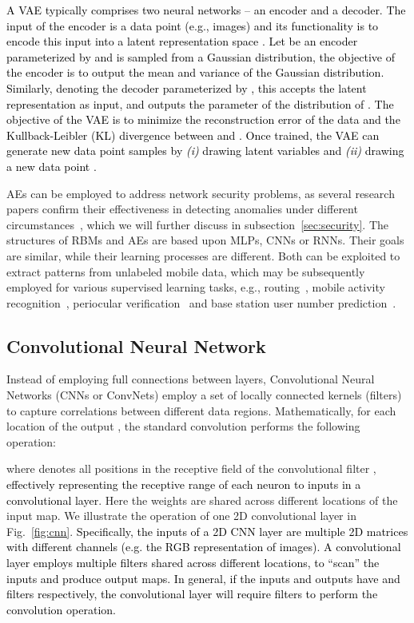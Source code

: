\documentclass[journal,comsoc,letter]{IEEEtran}
\newcommand{\edit}[1]{\textcolor{black}{#1}}
\newcommand{\rev}[1]{\textcolor{black}{#1}}
\begin{document}
\edit{
A VAE typically comprises two neural networks -- an encoder and a decoder. The input of the encoder is a data point  (e.g., images) and its functionality is to encode this input into a latent representation space . Let  be an encoder parameterized by  and  is sampled from a Gaussian distribution, the objective of the encoder is to output the mean and variance of the Gaussian distribution.}
\edit{
Similarly, denoting  the decoder parameterized by , this accepts the latent representation  as input, and outputs the parameter of the distribution of . The objective of the VAE is to minimize the reconstruction error of the data and the  Kullback-Leibler (KL) divergence between  and . Once trained, the VAE can generate new data point samples by \emph{(i)} drawing latent variables  and \emph{(ii)} drawing a new data point .}

AEs can be employed to address network security problems, as several research papers confirm their effectiveness in detecting anomalies under different circumstances~\cite{sakurada2014anomaly, nicolau2016hybrid, thing2017ieee}, which we will further discuss in subsection~\ref{sec:security}.
The structures of RBMs and AEs are based upon MLPs, CNNs or RNNs. Their goals are similar, while their learning processes are different. Both  can be exploited to extract patterns from unlabeled mobile data, which may be subsequently employed for various supervised learning tasks, e.g., routing~\cite{mao2017routing}, mobile activity recognition~\cite{radu2016towards, radu2018multimodal}, periocular verification~\cite{raghavendra2016learning} and base station user number prediction~\cite{li2016wavelet}.

\subsection{Convolutional Neural Network}
Instead of employing full connections between layers, Convolutional Neural Networks (CNNs or ConvNets) employ a set of locally connected kernels (filters) to capture correlations between different data regions. Mathematically, for each location  of the output , the standard convolution performs the following operation:

where  denotes all positions in the receptive field  of the convolutional filter , \rev{effectively representing the receptive range of each neuron to inputs in a convolutional layer}. Here the weights  are shared across different locations of the input map. We illustrate the operation of one 2D convolutional layer in Fig.~\ref{fig:cnn}. \rev{Specifically, the inputs of a 2D CNN layer are multiple 2D matrices with different channels (e.g. the RGB representation of images). A convolutional layer employs multiple filters shared across different locations, to ``scan'' the inputs and produce output maps. In general, if the inputs and outputs have  and  filters respectively, the convolutional layer will require  filters to perform the convolution operation.}
\end{document}
